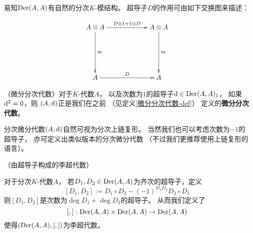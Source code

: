 易知$\operatorname{Der}(A,A)$有自然的分次$K$-模结构。
超导子$D$的作用可由如下交换图来描述：

$$
  \xymatrixcolsep{5pc}
  \xybigrow
  \xymatrix{
       A\ten A  \ar[r]^-{D\ten 1+1\ten D}   \ar[d]^-m
     & A\ten A                              \ar[d]^-m
  \\
       A        \ar[r]^-{D}
     & A
  }
$$

\begin{rem}（微分分次代数）对于$K$-代数$A$，
以及次数为$1$的超导子$\mathrm{d}\in\operatorname{Der}(A,A)_1$，
如果$\mathrm{d}^2=0$，则
$(A,\mathrm{d})$正是我们在之前
（见定义\ref{微分分次代数-def}）
定义的\textbf{微分分次代数}。
\end{rem}
分次微分代数$(A,\mathrm{d})$自然可视为分次上链复形。
当然我们也可以考虑次数为$-1$的超导子，
亦可定义出类似版本的分次微分代数
（不过我们更推荐使用上链复形的语言）。

\begin{lemma}（由超导子构成的李超代数）

对于分次$K$-代数$A$，
若$D_1,D_2\in\operatorname{Der}(A,A)$为齐次的超导子，定义
$$[D_1,D_2]:=D_1\circ D_2-(-1)^{D_1D_2}D_2\circ D_1$$
则$[D_1,D_2]$是次数为$\deg D_1+\deg D_2$的超导子。
从而我们定义了
$$[,]:\operatorname{Der}(A,A)\times\operatorname{Der}(A,A)\to\operatorname{Der}(A,A)$$
使得$(\operatorname{Der}(A,A),[,])$为李超代数。
\end{lemma}

